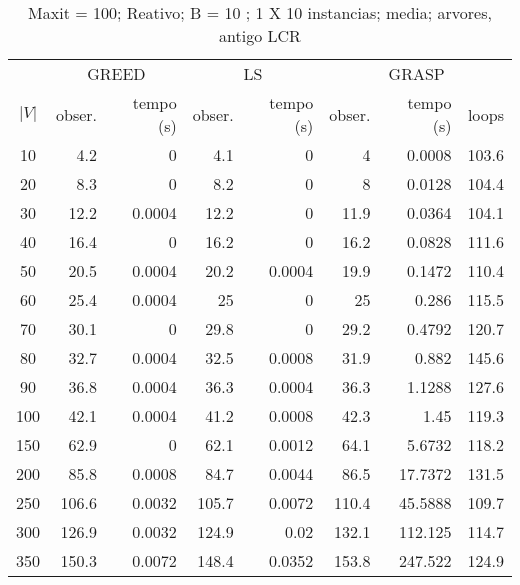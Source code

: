 \documentclass[]{article}
\begin{document}
\begin {table}[h]
\centering
\caption{Maxit = 100; Reativo; B = 10 ; 1 X 10 instancias; media; arvores, antigo LCR}
\begin{small}
	\begin{tabular}{|c|r|r|r|r|r|r|r|}
		\hline
		& \multicolumn{2}{c|}{GREED} & \multicolumn{2}{c|}{LS} & \multicolumn{3}{c|}{GRASP} \\ 
		\cline{2-8}
		$|V|$   &  obser. & tempo (s)  & obser. & tempo (s) & obser. & tempo (s) & loops\\ 
		\hline
		10 & 4.2 & 0 & 4.1 & 0 & 4 & 0.0008 & 103.6 \\ 
		20 & 8.3 & 0 & 8.2 & 0 & 8 & 0.0128 & 104.4 \\ 
		30 & 12.2 & 0.0004 & 12.2 & 0 & 11.9 & 0.0364 & 104.1 \\ 
		40 & 16.4 & 0 & 16.2 & 0 & 16.2 & 0.0828 & 111.6 \\ 
		50 & 20.5 & 0.0004 & 20.2 & 0.0004 & 19.9 & 0.1472 & 110.4 \\ 
		60 & 25.4 & 0.0004 & 25 & 0 & 25 & 0.286 & 115.5 \\ 
		70 & 30.1 & 0 & 29.8 & 0 & 29.2 & 0.4792 & 120.7 \\ 
		80 & 32.7 & 0.0004 & 32.5 & 0.0008 & 31.9 & 0.882 & 145.6 \\ 
		90 & 36.8 & 0.0004 & 36.3 & 0.0004 & 36.3 & 1.1288 & 127.6 \\ 
		100 & 42.1 & 0.0004 & 41.2 & 0.0008 & 42.3 & 1.45 & 119.3 \\ 
		150 & 62.9 & 0 & 62.1 & 0.0012 & 64.1 & 5.6732 & 118.2 \\ 
		200 & 85.8 & 0.0008 & 84.7 & 0.0044 & 86.5 & 17.7372 & 131.5 \\ 
		250 & 106.6 & 0.0032 & 105.7 & 0.0072 & 110.4 & 45.5888 & 109.7 \\ 
		300 & 126.9 & 0.0032 & 124.9 & 0.02 & 132.1 & 112.125 & 114.7 \\ 
		350 & 150.3 & 0.0072 & 148.4 & 0.0352 & 153.8 & 247.522 & 124.9 \\ 
		\hline
	\end{tabular} \label{}
\end{small}
\end{table}
\end{document}
